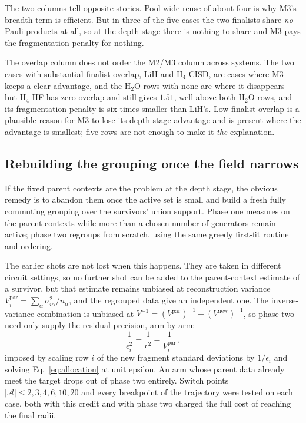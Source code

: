 \documentclass[10pt]{article}
\begin{document}
The two columns tell opposite stories. Pool-wide reuse of about four is why M3's breadth term is efficient. But in three of the five cases the two finalists share \emph{no} Pauli products at all, so at the depth stage there is nothing to share and M3 pays the fragmentation penalty for nothing.

The overlap column does not order the M2/M3 column across systems. The two cases with substantial finalist overlap, LiH and H$_4$ CISD, are cases where M3 keeps a clear advantage, and the H$_2$O rows with none are where it disappears --- but H$_4$ HF has zero overlap and still gives $1.51$, well above both H$_2$O rows, and its fragmentation penalty is six times smaller than LiH's. Low finalist overlap is a plausible reason for M3 to lose its depth-stage advantage and is present where the advantage is smallest; five rows are not enough to make it \emph{the} explanation.

\subsection{Rebuilding the grouping once the field narrows}
\label{sec:hybrid}

If the fixed parent contexts are the problem at the depth stage, the obvious
remedy is to abandon them once the active set is small and build a fresh fully
commuting grouping over the survivors' union support. Phase one measures on the
parent contexts while more than a chosen number of generators remain active;
phase two regroups from scratch, using the same greedy first-fit routine and
ordering.

The earlier shots are not lost when this happens. They are taken in different
circuit settings, so no further shot can be added to the parent-context estimate
of a survivor, but that estimate remains unbiased at reconstruction variance
$V^{\mathrm{par}}_i=\sum_\alpha\sigma_{i\alpha}^2/n_\alpha$, and the regrouped
data give an independent one. The inverse-variance combination is unbiased at
$V^{-1}=(V^{\mathrm{par}})^{-1}+(V^{\mathrm{new}})^{-1}$, so phase two need only
supply the residual precision, arm by arm:
\begin{equation}
  \frac{1}{\epsilon_i^2}=\frac{1}{\epsilon^2}-\frac{1}{V^{\mathrm{par}}_i} ,
  \label{eq:reuse}
\end{equation}
imposed by scaling row $i$ of the new fragment standard deviations by
$1/\epsilon_i$ and solving Eq.~\eqref{eq:allocation} at unit epsilon. An arm whose
parent data already meet the target drops out of phase two entirely. Switch points
$|\mathcal A|\le2,3,4,6,10,20$ and every breakpoint of the trajectory were tested
on each case, both with this credit and with phase two charged the full cost of
reaching the final radii.
\end{document}
